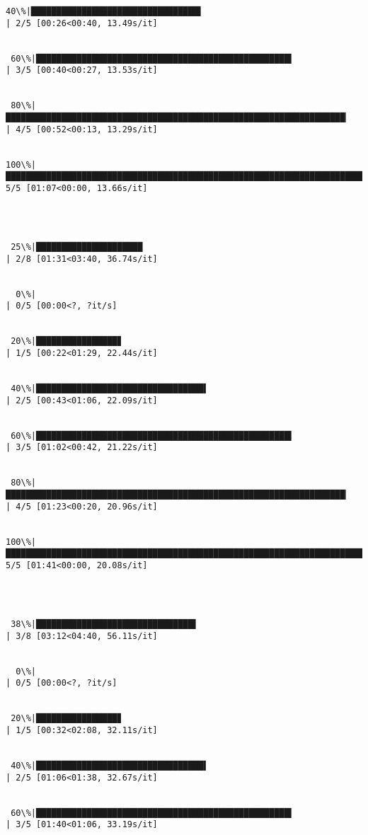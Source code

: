 \documentclass[11pt]{article}
\begin{document}
\begin{Verbatim}[commandchars=\\\{\}]
 40\%|█████████████████████████████████▌                                                  | 2/5 [00:26<00:40, 13.49s/it]


 60\%|██████████████████████████████████████████████████▍                                 | 3/5 [00:40<00:27, 13.53s/it]


 80\%|███████████████████████████████████████████████████████████████████▏                | 4/5 [00:52<00:13, 13.29s/it]


100\%|████████████████████████████████████████████████████████████████████████████████████| 5/5 [01:07<00:00, 13.66s/it]




 25\%|█████████████████████                                                               | 2/8 [01:31<03:40, 36.74s/it]


  0\%|                                                                                            | 0/5 [00:00<?, ?it/s]


 20\%|████████████████▊                                                                   | 1/5 [00:22<01:29, 22.44s/it]


 40\%|█████████████████████████████████▌                                                  | 2/5 [00:43<01:06, 22.09s/it]


 60\%|██████████████████████████████████████████████████▍                                 | 3/5 [01:02<00:42, 21.22s/it]


 80\%|███████████████████████████████████████████████████████████████████▏                | 4/5 [01:23<00:20, 20.96s/it]


100\%|████████████████████████████████████████████████████████████████████████████████████| 5/5 [01:41<00:00, 20.08s/it]




 38\%|███████████████████████████████▌                                                    | 3/8 [03:12<04:40, 56.11s/it]


  0\%|                                                                                            | 0/5 [00:00<?, ?it/s]


 20\%|████████████████▊                                                                   | 1/5 [00:32<02:08, 32.11s/it]


 40\%|█████████████████████████████████▌                                                  | 2/5 [01:06<01:38, 32.67s/it]


 60\%|██████████████████████████████████████████████████▍                                 | 3/5 [01:40<01:06, 33.19s/it]



\end{Verbatim}
\end{document}
